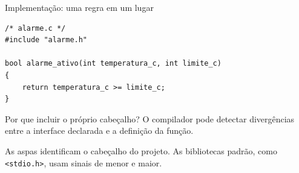 \begin{frame}[fragile]{Implementação: uma regra em um lugar}
\begin{lstlisting}
/* alarme.c */
#include "alarme.h"

bool alarme_ativo(int temperatura_c, int limite_c)
{
    return temperatura_c >= limite_c;
}
\end{lstlisting}
\begin{block}{Por que incluir o próprio cabeçalho?}
O compilador pode detectar divergências entre a interface declarada e a definição da função.
\end{block}
\small As aspas identificam o cabeçalho do projeto. As bibliotecas padrão, como \texttt{<stdio.h>}, usam sinais de menor e maior.
\end{frame}
